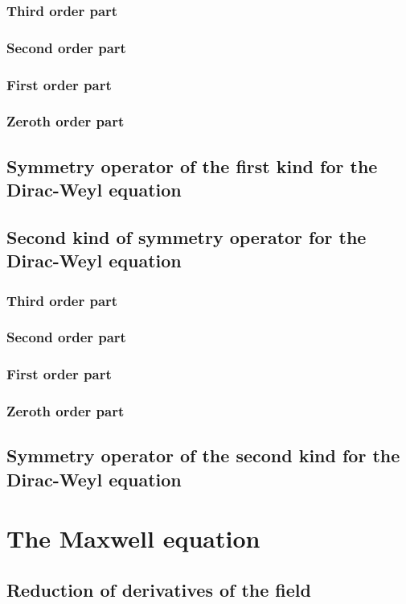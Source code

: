 \documentclass[a4paper, 10pt]{iopart}
\numberwithin{equation}{section}
\begin{document}
\subsubsection{Third order part}
\subsubsection{Second order part}
\subsubsection{First order part}
\subsubsection{Zeroth order part}
\subsection{Symmetry operator of the first kind for the Dirac-Weyl equation}
\subsection{Second kind of symmetry operator for the Dirac-Weyl equation}
\subsubsection{Third order part}
\subsubsection{Second order part}
\subsubsection{First order part}
\subsubsection{Zeroth order part}
\subsection{Symmetry operator of the second kind for the Dirac-Weyl equation}
\section{The Maxwell equation}
\subsection{Reduction of derivatives of the field}
\end{document}
